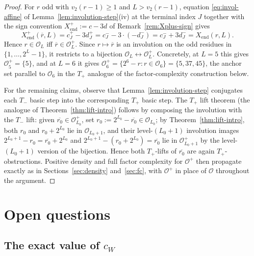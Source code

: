 \documentclass[11pt,reqno]{amsart}
\theoremstyle{plain}
\theoremstyle{definition}
\theoremstyle{remark}
\newcommand{\Tplus}{T_{+}}
\newcommand{\Tminus}{T_{-}}
\newcommand{\Obs}{\mathcal{O}}
\newcommand{\Xend}{X_{\mathrm{end}}}
\newcommand{\vtwo}{v_{2}}
\begin{document}
\begin{proof}
For $r$ odd with $\vtwo(r-1) \ge 1$ and $L > \vtwo(r-1)$, equation
\eqref{eq:invol-affine} of Lemma~\ref{lem:involution-step}(iv) at the
terminal index $J$ together with the sign convention
$\Xend^{+} := c - 3d$ of Remark~\ref{rem:Xplus-sign} gives
\[
\Xend^{+}(\overline{r}, L) = c_J^{+} - 3 d_J^{+}
  = c_J^{-} - 3 \cdot (-d_J^{-})
  = c_J^{-} + 3 d_J^{-}
  = \Xend(r, L).
\]
Hence $r \in \Obs_L$ iff $\overline{r} \in \Obs_L^{+}$. Since
$r \mapsto \overline{r}$ is an involution on the odd residues in
$\{1, \ldots, 2^L - 1\}$, it restricts to a bijection
$\Obs_L \leftrightarrow \Obs_L^{+}$. Concretely, at $L = 5$ this gives
$\Obs_5^{+} = \{5\}$, and at $L = 6$ it gives
$\Obs_6^{+} = \{2^6 - r : r \in \Obs_6\} = \{5, 37, 45\}$, the anchor set
parallel to $\Obs_6$ in the $\Tplus$ analogue of the
factor-complexity construction below.

For the remaining claims, observe that
Lemma~\ref{lem:involution-step} conjugates each $\Tminus$ basic step
into the corresponding $\Tplus$ basic step. The $\Tplus$ lift theorem
(the analogue of Theorem~\ref{thm:lift-intro}) follows by composing the
involution with the $\Tminus$ lift: given
$\overline{r_0} \in \Obs_{L_0}^{+}$, set $r_0 := 2^{L_0} - \overline{r_0} \in \Obs_{L_0}$;
by Theorem~\ref{thm:lift-intro}, both $r_0$ and $r_0 + 2^{L_0}$ lie in
$\Obs_{L_0+1}$, and their level-$(L_0+1)$ involution images
$2^{L_0+1} - r_0 = \overline{r_0} + 2^{L_0}$ and
$2^{L_0+1} - (r_0 + 2^{L_0}) = \overline{r_0}$ lie in $\Obs_{L_0+1}^{+}$
by the level-$(L_0+1)$ version of the bijection. Hence both
$\Tplus$-lifts of $\overline{r_0}$ are again $\Tplus$-obstructions.
Positive density and full factor complexity for $\Obs^{+}$ then
propagate exactly as in Sections~\ref{sec:density}
and~\ref{sec:fc}, with $\Obs^{+}$ in place of $\Obs$ throughout the
argument. \qedhere
\end{proof}

\section{Open questions}
\label{sec:open}

\subsection{The exact value of \texorpdfstring{$c_W$}{cW}}
\end{document}
